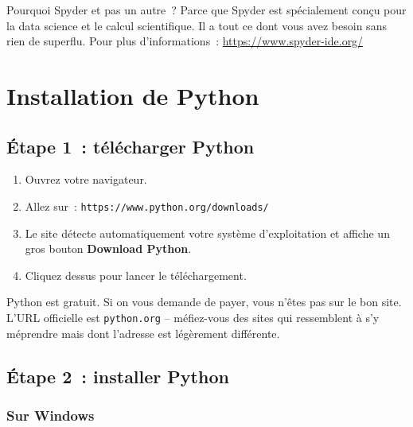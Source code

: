 \documentclass[12pt,a4paper]{article}
\begin{document}
	\begin{astuce}
		Pourquoi Spyder et pas un autre~? Parce que Spyder est spécialement conçu pour la data science et le calcul scientifique. Il a tout ce dont vous avez besoin sans rien de superflu. Pour plus d'informations~: \url{https://www.spyder-ide.org/}
	\end{astuce}
	
	\section{Installation de Python}
	
	\subsection{Étape 1~: télécharger Python}
	
	\begin{etape}
		\begin{enumerate}
			\item Ouvrez votre navigateur.
			\item Allez sur~: \texttt{https://www.python.org/downloads/}
			\item Le site détecte automatiquement votre système d'exploitation et affiche un gros bouton \textbf{Download Python}.
			\item Cliquez dessus pour lancer le téléchargement.
		\end{enumerate}
	\end{etape}
	
	\begin{astuce}
		Python est gratuit. Si on vous demande de payer, vous n'êtes pas sur le bon site. L'URL officielle est \texttt{python.org} -- méfiez-vous des sites qui ressemblent à s'y méprendre mais dont l'adresse est légèrement différente.
	\end{astuce}
	
	\subsection{Étape 2~: installer Python}
	
	\subsubsection{Sur Windows}
	
\end{document}
